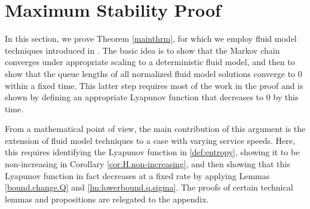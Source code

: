 \documentclass{amsart}
\newtheorem{lemma}{Lemma}
\begin{document}
\fi
 

\iffalse
\begin{lemma}
If $x$ and $y$ belong to the interval $[0,K]$ for $K>0$ then
\begin{equation}
y\log \left(\frac{y}{x}\right) - (y-x) \geq \frac{1}{2 K} \left(y-x \right)^2.
\end{equation}
\end{lemma}
\proof{Proof}
Consider the function
\begin{equation}
F(z) = z\log z - (z-1).
\end{equation}
Differentiating we see that $F\rq{}(z)= \log z$ and $F\rq{}\rq{}(z) = z^{-1}$. Taking a Taylor expansion around $z=1$ we have that, for some $\theta$ in the interval containing $1$ and $z$,
\begin{align*}
F(z) &= F(z) - F(1) \\
 &= F\rq{}(1) (z-1) + \frac{1}{2} F\rq{}\rq{}(\theta) (z-1)^2\\
& = \frac{1}{2\theta} (z-1)^2 \geq \frac{1}{2 (1\vee z )} (z-1)^2
\end{align*}
The last equality, holds since $\theta \leq (1 \vee z)$. Applying this bound, we observe that
\begin{align*}
y\log \left(\frac{y}{x}\right) - (y-x) &= x F(\tfrac{y}{x}) \\
 &=\frac{x}{2 (1\vee \frac{y}{x} )} \left(\frac{y}{x}-1\right)^2\\
& \geq \frac{1}{2 (x\vee y) } (y-x)^2 \\
& \geq \frac{1}{2 K} (y-x)^2.
\end{align*}
This yields the required bound.
{}\endproof
\fi 

\fi

\section{Maximum Stability Proof} \label{PROOF}
In this section, we prove Theorem \ref{mainthrm}, for which we employ fluid model
techniques introduced in  \cite{Da95}.
The basic idea is to show that the Markov chain converges under appropriate scaling to a deterministic fluid model, 
and then to show that the queue lengths of all normalized fluid model solutions converge to $0$ within
a fixed time.
This latter step requires most of the work in the proof 
and is shown by defining an appropriate Lyapunov function that
decreases to $0$ by this time.  

From a mathematical point of view, the main contribution of this argument is the extension of fluid model techniques to a case with varying service speeds.
Here, this requires identifying the Lyapunov function in \eqref{def:entropy}, showing it to be non-increasing in Corollary \ref{cor:H.non-increasing},
and then showing that this Lyapunov function in fact decreases at a fixed rate by applying Lemmas \ref{bound.change.Q} and \ref{lm:lowerbound.q.sigma}. 
The proofs of certain technical lemmas and propositions are relegated to the appendix.
\end{document}
